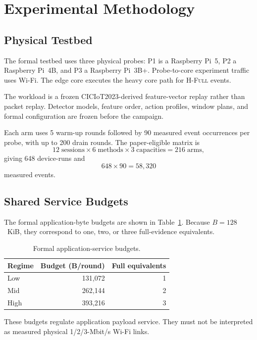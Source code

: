 \documentclass[10pt,journal]{IEEEtran}
\newcommand{\Hfull}{\textsc{H-Full}}
\begin{document}
\section{Experimental Methodology}
\label{sec:method}

\subsection{Physical Testbed}

The formal testbed uses three physical probes:
P1 is a Raspberry Pi~5, P2 a Raspberry Pi~4B, and P3 a Raspberry
Pi~3B+. Probe-to-core experiment traffic uses Wi-Fi. The edge core
executes the heavy core path for \Hfull{} events.

The workload is a frozen CICIoT2023-derived feature-vector replay rather
than packet replay. Detector models, feature order, action profiles,
window plans, and formal configuration are frozen before the campaign.

Each arm uses 5 warm-up rounds followed by 90 measured event occurrences
per probe, with up to 200 drain rounds. The paper-eligible matrix is
\[
12\;\text{sessions}
\times
6\;\text{methods}
\times
3\;\text{capacities}
=
216\;\text{arms},
\]
giving 648 device-runs and
\[
648\times90=58,320
\]
measured events.

\subsection{Shared Service Budgets}

The formal application-byte budgets are shown in
Table~\ref{tab:capacity}. Because $B=128$~KiB, they correspond to one,
two, or three full-evidence equivalents.

\begin{table}[t]
\centering
\caption{Formal application-service budgets.}
\label{tab:capacity}
\small
\begin{tabular}{@{}lrr@{}}
\toprule
Regime & Budget (B/round) & Full equivalents \\
\midrule
Low  & 131,072 & 1 \\
Mid  & 262,144 & 2 \\
High & 393,216 & 3 \\
\bottomrule
\end{tabular}
\end{table}

These budgets regulate application payload service. They must not be
interpreted as measured physical 1/2/3-Mbit/s Wi-Fi links.
\end{document}
